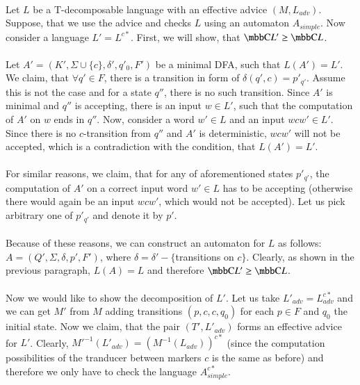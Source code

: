 \paragraph{}
\dokaz Let $L$ be a T-decomposable language with an effective advice $(M, L_{adv})$. Suppose, that we use the advice and checks $L$ using an automaton $A_{simple}$. Now consider a language $L' = L^{c*}$. First, we will show, that $\C{L'} \geq \C{L}$.

\paragraph{}
Let $A' = (K', \Sigma \cup \{c\}, \delta', q'_0, F')$ be a minimal DFA, such that $L(A') = L'$. We claim, that $\forall q' \in F$, there is a transition in form of $\delta(q', c) = p'_{q'}$. Assume this is not the case and for a state $q''$, there is no such transition. Since $A'$ is minimal and $q''$ is accepting, there is an input $w \in L'$, such that the computation of $A'$ on $w$ ends in $q''$. Now, consider a word $w' \in L$ and an input $wcw' \in L'$. Since there is no $c$-transition from $q''$ and $A'$ is deterministic, $wcw'$ will not be accepted, which is a contradiction with the condition, that $L(A') = L'$.

\paragraph{}
For similar reasons, we claim, that for any of aforementioned states $p'_{q'}$, the computation of $A'$ on a correct input word $w' \in L$ has to be accepting (otherwise there would again be an input $wcw'$, which would not be accepted). Let us pick arbitrary one of $p'_{q'}$ and denote it by $p'$.

\paragraph{}
Because of these reasons, we can construct an automaton for $L$ as follows: $A = (Q', \Sigma,\delta, \allowbreak p',  F')$, where $\delta = \delta' - \{$transitions on $c \}$. Clearly, as shown in the previous paragraph, $L(A) = L$ and therefore $\C{L'} \geq \C{L}$.

\paragraph{}
Now we would like to show the decomposition of $L'$. Let us take $L'_{adv} = L_{adv}^{c*}$ and we can get $M'$ from $M$ adding transitions $(p, c, c, q_0)$ for each $p \in F$ and $q_0$ the initial state. Now we claim, that the pair $(T', L'_{adv})$ forms an effective advice for $L'$. Clearly, $M'^{-1}(L'_{adv}) = (M^{-1}(L_{adv}))^{c*}$ (since the computation possibilities of the tranducer between markers $c$ is the  same as before) and therefore we only have to check the language $A_{simple}^{c*}$.

